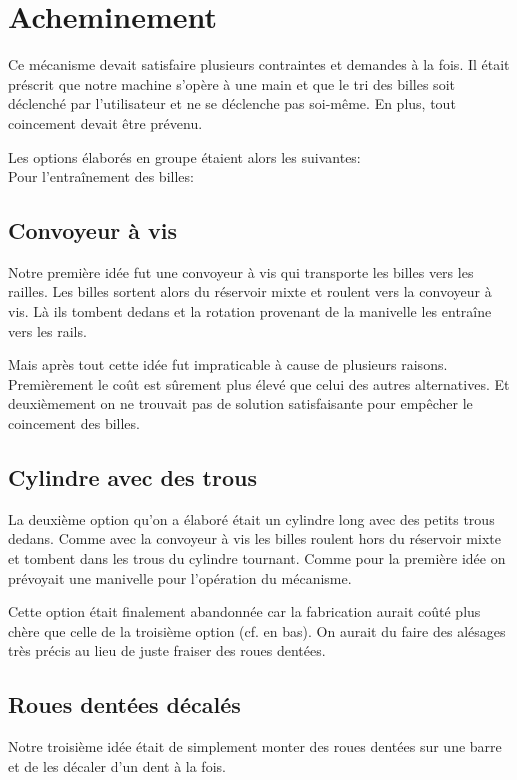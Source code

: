 
\section{Acheminement}
Ce mécanisme devait satisfaire plusieurs contraintes et demandes à la fois. Il était préscrit que notre machine s'opère à une main et que le tri des billes soit déclenché par l'utilisateur et ne se déclenche pas soi-même. En plus, tout coincement devait être prévenu.

Les options élaborés en groupe étaient alors les suivantes:\\
Pour l'entraînement des billes:

\subsection{Convoyeur à vis}
Notre première idée fut une convoyeur à vis qui transporte les billes vers les railles. Les billes sortent alors du réservoir mixte et roulent vers la convoyeur à vis. Là ils tombent dedans et la rotation provenant de la manivelle les entraîne vers les rails.


Mais après tout cette idée fut impraticable à cause de plusieurs raisons. Premièrement le coût est sûrement plus élevé que celui des autres alternatives. Et deuxièmement on ne trouvait pas de solution satisfaisante pour empêcher le coincement des billes.

\subsection{Cylindre avec des trous}
La deuxième option qu'on a élaboré était un cylindre long avec des petits trous dedans. Comme avec la convoyeur à vis les billes roulent hors du réservoir mixte et tombent dans les trous du cylindre tournant. Comme pour la première idée on prévoyait une manivelle pour l'opération du mécanisme.


Cette option était finalement abandonnée car la fabrication aurait coûté plus chère que celle de la troisième option (cf. en bas). On aurait du faire des alésages très précis au lieu de juste fraiser des roues dentées.

\subsection{Roues dentées décalés}
Notre troisième idée était de simplement monter des roues dentées sur une barre et de les décaler d'un dent à la fois.

